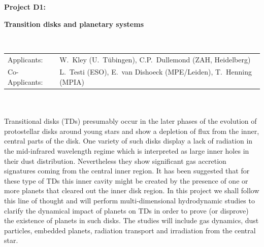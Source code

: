 \documentclass[10pt,fleqn,twoside]{article}
\begin{document}
\newpage


\setcounter{page}{141}

\centerline{\huge\bf\Tcol
%
%
%
%
%
 Project D1:}
\vspace{1em}

\centerline{\LARGE\bf\Tcol Transition disks and planetary systems}

%
%
%
%
%
\vskip1.0cm


\\
\begin{tabular}{ll}
{\textsf{Applicants:}}        & W.~Kley (U.~T\"ubingen), C.P.~Dullemond (ZAH, Heidelberg)\\
{\textsf{Co-Applicants:}}     & L.~Testi (ESO), E.~van Dishoeck (MPE/Leiden), T.~Henning (MPIA)\\
\end{tabular}


\vspace{1em}
 \\

\vspace{1em}
\\
Transitional disks (TDs) presumably occur in the later phases of the evolution of
protostellar disks around young stars and show a depletion of flux from the inner, central parts of the disk.
One variety of such disks display a lack of radiation in the mid-infrared wavelength regime which is interpreted
as large inner holes in their dust distribution.
Nevertheless they show significant gas accretion signatures coming from the central inner region. 
It has been suggested that for these type of TDs this inner cavity might be
created by the presence of one or more planets that cleared out the inner disk region.
In this project we shall follow this line of thought and will perform multi-dimensional hydrodynamic studies
to clarify the dynamical impact of planets on TDs in order to prove (or disprove) the existence of planets in such disks.
The studies will include gas dynamics, dust particles, embedded planets, radiation transport
and irradiation from the central star.
\end{document}
